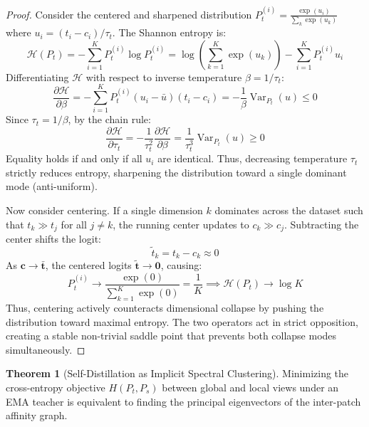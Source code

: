 \documentclass[11pt,a4paper]{article}
\theoremstyle{definition}
\newtheorem{theorem}{\textbf{Theorem}}[section]
\begin{document}
\begin{proof}
Consider the centered and sharpened distribution $P_t^{(i)} = \frac{\exp(u_i)}{\sum_k \exp(u_k)}$ where $u_i = (t_i - c_i) / \tau_t$.
The Shannon entropy is:
{\boldmath
\begin{equation}
\mathcal{H}(P_t) = -\sum_{i=1}^K P_t^{(i)} \log P_t^{(i)} = \log\left( \sum_{k=1}^K \exp(u_k) \right) - \sum_{i=1}^K P_t^{(i)} u_i
\end{equation}
}
Differentiating $\mathcal{H}$ with respect to inverse temperature $\beta = 1/\tau_t$:
{\boldmath
\begin{equation}
\frac{\partial \mathcal{H}}{\partial \beta} = -\sum_{i=1}^K P_t^{(i)} (u_i - \bar{u}) (t_i - c_i) = -\frac{1}{\beta} \operatorname{Var}_{P_t}(u) \le 0
\end{equation}
}
Since $\tau_t = 1/\beta$, by the chain rule:
{\boldmath
\begin{equation}
\frac{\partial \mathcal{H}}{\partial \tau_t} = -\frac{1}{\tau_t^2} \frac{\partial \mathcal{H}}{\partial \beta} = \frac{1}{\tau_t^3} \operatorname{Var}_{P_t}(u) \ge 0
\end{equation}
}
Equality holds if and only if all $u_i$ are identical. Thus, decreasing temperature $\tau_t$ strictly reduces entropy, sharpening the distribution toward a single dominant mode (anti-uniform).

Now consider centering. If a single dimension $k$ dominates across the dataset such that $t_k \gg t_j$ for all $j \ne k$, the running center updates to $c_k \gg c_j$.
Subtracting the center shifts the logit:
{\boldmath
\begin{equation}
\tilde{t}_k = t_k - c_k \approx 0
\end{equation}
}
As $\mathbf{c} \to \bar{\mathbf{t}}$, the centered logits $\tilde{\mathbf{t}} \to \mathbf{0}$, causing:
{\boldmath
\begin{equation}
P_t^{(i)} \to \frac{\exp(0)}{\sum_{k=1}^K \exp(0)} = \frac{1}{K} \implies \mathcal{H}(P_t) \to \log K
\end{equation}
}
Thus, centering actively counteracts dimensional collapse by pushing the distribution toward maximal entropy. The two operators act in strict opposition, creating a stable non-trivial saddle point that prevents both collapse modes simultaneously.
\end{proof}

\begin{theorem}[Self-Distillation as Implicit Spectral Clustering]
Minimizing the cross-entropy objective $H(P_t, P_s)$ between global and local views under an EMA teacher is equivalent to finding the principal eigenvectors of the inter-patch affinity graph.
\end{theorem}
\end{document}
